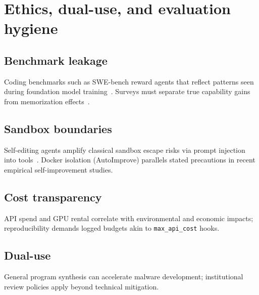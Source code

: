 \section{Ethics, dual-use, and evaluation hygiene}
\label{sec:ethics}

\subsection{Benchmark leakage}
Coding benchmarks such as SWE-bench reward agents that reflect patterns seen during foundation model training~\cite{jimenez2024swebench}.
Surveys must separate true capability gains from memorization effects~\cite{brown2020language}.

\subsection{Sandbox boundaries}
Self-editing agents amplify classical sandbox escape risks via prompt injection into tools~\cite{zhang2025darwin}.
Docker isolation (AutoImprove) parallels stated precautions in recent empirical self-improvement studies.

\subsection{Cost transparency}
API spend and GPU rental correlate with environmental and economic impacts; reproducibility demands logged budgets akin to \texttt{max\_api\_cost} hooks.

\subsection{Dual-use}
General program synthesis can accelerate malware development; institutional review policies apply beyond technical mitigation.
